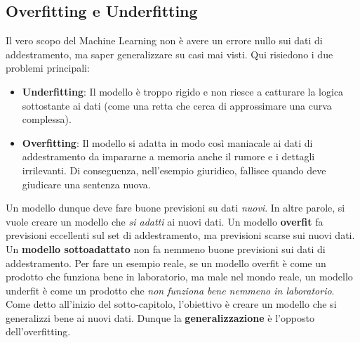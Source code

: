 \documentclass{article}
\begin{document}
\subsection{Overfitting e Underfitting}
Il vero scopo del Machine Learning non è avere un errore nullo sui dati di addestramento, ma saper generalizzare su casi mai visti. Qui risiedono i due problemi principali:
\begin{itemize}
    \item \textbf{Underfitting}: Il modello è troppo rigido e non riesce a catturare la logica sottostante ai dati (come una retta che cerca di approssimare una curva complessa).

    \item \textbf{Overfitting}: Il modello si adatta in modo così maniacale ai dati di addestramento da impararne a memoria anche il rumore e i dettagli irrilevanti. Di conseguenza, nell'esempio giuridico, fallisce quando deve giudicare una sentenza nuova.

\end{itemize}
Un modello dunque deve fare buone previsioni su dati \textit{nuovi}. In altre parole, si vuole creare un modello che \textit{si adatti} ai nuovi dati. Un modello \textbf{overfit} fa previsioni eccellenti sul set di addestramento, ma previsioni scarse sui nuovi dati. Un \textbf{modello sottoadattato} non fa nemmeno buone previsioni sui dati di addestramento. Per fare un esempio reale, se un modello overfit è come un prodotto che funziona bene in laboratorio, ma male nel mondo reale, un modello underfit è come un prodotto che \textit{non funziona bene nemmeno in laboratorio}.
\\
Come detto all'inizio del sotto-capitolo, l'obiettivo è creare un modello che si generalizzi bene ai nuovi dati. Dunque la \textbf{generalizzazione} è l'opposto dell'overfitting.
\end{document}
